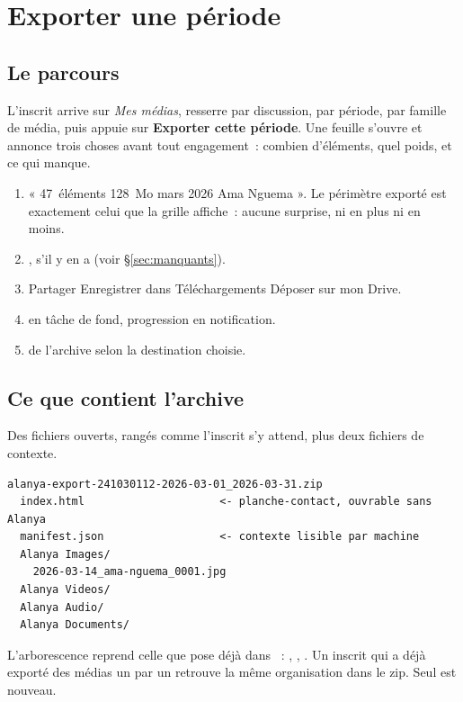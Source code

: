 \documentclass[11pt,a4paper,oneside]{report}
\begin{document}
\chapter{Exporter une période}
\label{ch:export}

\section{Le parcours}

L'inscrit arrive sur \emph{Mes médias}, resserre par discussion, par période, par famille
de média, puis appuie sur \textbf{Exporter cette période}. Une feuille s'ouvre et annonce
trois choses avant tout engagement~: combien d'éléments, quel poids, et ce qui manque.

\begin{enumerate}[leftmargin=*]
  \item {} « 47~éléments \textbullet{} 128~Mo \textbullet{} mars 2026
        \textbullet{} Ama Nguema ». Le périmètre exporté est exactement celui que la grille
        affiche~: aucune surprise, ni en plus ni en moins.
  \item {}, s'il y en a (voir §\ref{sec:manquants}).
  \item {} Partager \textbullet{} Enregistrer dans Téléchargements
        \textbullet{} Déposer sur mon Drive.
  \item {} en tâche de fond, progression en notification.
  \item {} de l'archive selon la destination choisie.
\end{enumerate}

\section{Ce que contient l'archive}

Des fichiers ouverts, rangés comme l'inscrit s'y attend, plus deux fichiers de contexte.

\begin{lstlisting}[style=Alanya, language={}]
alanya-export-241030112-2026-03-01_2026-03-31.zip
  index.html                     <- planche-contact, ouvrable sans Alanya
  manifest.json                  <- contexte lisible par machine
  Alanya Images/
    2026-03-14_ama-nguema_0001.jpg
  Alanya Videos/
  Alanya Audio/
  Alanya Documents/
\end{lstlisting}

\begin{constat}
L'arborescence reprend celle que  pose déjà dans
~: , ,
. Un inscrit qui a déjà exporté des médias un par un retrouve la
même organisation dans le zip. Seul  est nouveau.
\end{constat}
\end{document}
